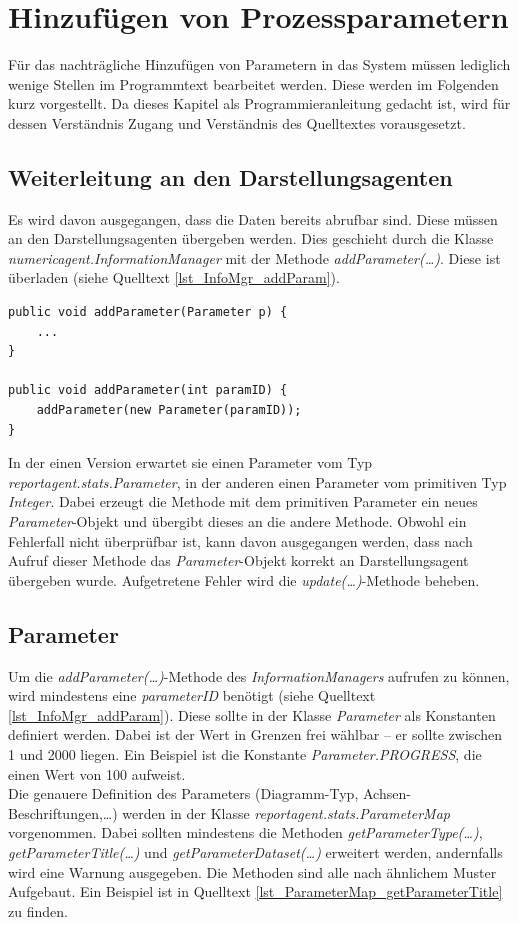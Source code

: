 \documentclass[a4paper,12pt,oneside,openright,onecolumn,final,titlepage,fleqn,ngerman]{scrreprt}
\renewcommand{\lstlistingname}{Quelltext}
\newcommand{\parag}{\\[2ex]}
\newcommand{\repag}{Darstellungsagent}
\begin{document}
	\chapter{Hinzufügen von Prozessparametern}\label{kap_AddParameter}
	Für das nachträgliche Hinzufügen von Parametern in das System müssen lediglich wenige Stellen im Programmtext bearbeitet werden. Diese werden im Folgenden kurz vorgestellt. Da dieses Kapitel als Programmieranleitung gedacht ist, wird für dessen Verständnis Zugang und Verständnis des Quelltextes vorausgesetzt.
	
	\section{Weiterleitung an den \repag{}en}
	Es wird davon ausgegangen, dass die Daten bereits abrufbar sind. Diese müssen an den \repag{}en übergeben werden. Dies geschieht durch die Klasse \emph{numericagent.InformationManager} mit der Methode \emph{addParameter(\ldots)}. Diese ist überladen (siehe \lstlistingname{} \ref{lst_InfoMgr_addParam}).
	\begin{lstlisting}[caption={Auszug aus numericagent.InformationManager},label={lst_InfoMgr_addParam}]	
public void addParameter(Parameter p) {
	...
}

public void addParameter(int paramID) {
	addParameter(new Parameter(paramID));
}
	\end{lstlisting}
	In der einen Version erwartet sie einen Parameter vom Typ \emph{reportagent.stats.Pa\-ra\-me\-ter}, in der anderen einen Parameter vom primitiven Typ \emph{Integer}. Dabei erzeugt die Methode mit dem primitiven Parameter ein neues \emph{Parameter}-Objekt und übergibt dieses an die andere Methode. Obwohl ein Fehlerfall nicht über\-prüf\-bar ist, kann davon ausgegangen werden, dass nach Aufruf dieser Methode das \emph{Parameter}-Objekt korrekt an \repag{} übergeben wurde. Aufgetretene Fehler wird die \emph{update(\ldots)}-Methode beheben.
	
	\section{Parameter}
	Um die \emph{addParameter(\ldots)}-Methode des \emph{InformationManagers} aufrufen zu kön\-nen, wird mindestens eine \emph{parameterID} benötigt (siehe \lstlistingname{} \ref{lst_InfoMgr_addParam}). Diese sollte in der Klasse \emph{Parameter} als Konstanten definiert werden. Dabei ist der Wert in Grenzen frei wählbar -- er sollte zwischen 1 und 2000 liegen. Ein Beispiel ist die Konstante \emph{Parameter.PROGRESS}, die einen Wert von 100 aufweist.\parag{}
	Die genauere Definition des Parameters (Diagramm-Typ, Achsen-Be\-schrif\-tung\-en,\ldots) werden in der Klasse \emph{reportagent.stats.ParameterMap} vorgenommen. Dabei sollten mindestens die Methoden \emph{getParameterType(\ldots)}, \emph{getParameterTitle(\ldots)} und \emph{getParameterDataset(\ldots)} erweitert werden, andernfalls wird eine Warnung ausgegeben. Die Methoden sind alle nach ähnlichem Muster Aufgebaut. Ein Beispiel ist in \lstlistingname{} \ref{lst_ParameterMap_getParameterTitle} zu finden.
	
\end{document}
